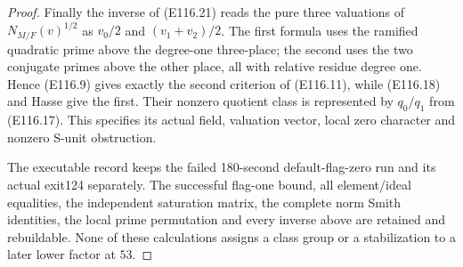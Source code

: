 \begin{proof}
Finally the inverse of (E116.21) reads the pure three
valuations of $N_{M/F}(v)^{1/2}$ as
$v_0/2$ and $(v_1+v_2)/2$.
The first formula uses the ramified quadratic prime
above the degree-one three-place; the second uses the
two conjugate primes above the other place, all with
relative residue degree one. Hence (E116.9) gives
exactly the second criterion of (E116.11), while
(E116.18) and Hasse give the first.
Their nonzero quotient class is represented by
$q_0/q_1$ from (E116.17). This specifies its actual
field, valuation vector, local zero character and
nonzero S-unit obstruction.

The executable record keeps the failed 180-second
default-flag-zero run and its actual exit124 separately.
The successful flag-one bound, all element/ideal
equalities, the independent saturation matrix,
the complete norm Smith identities, the local prime
permutation and every inverse above are retained and
rebuildable. None of these calculations assigns a
class group or a stabilization to a later lower factor
at $53$.
\end{proof}

